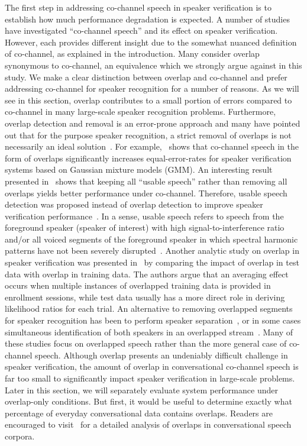 The first step in addressing co-channel speech in speaker verification is to establish how much performance degradation is expected. 
A number of studies have investigated ``co-channel speech'' and its effect on speaker verification. 
However, each provides different insight due to the somewhat nuanced definition of co-channel, as explained in the introduction. 
Many consider overlap synonymous to co-channel, an equivalence which we strongly argue against in this study. 
We make a clear distinction between overlap and co-channel and prefer addressing co-channel for speaker recognition for a number of reasons. 
As we will see in this section, overlap contributes to a small portion of errors compared to co-channel in many large-scale speaker recognition problems. 
Furthermore, overlap detection and removal is an error-prone approach and many have pointed out that for the purpose speaker recognition, a strict removal of overlaps is not necessarily an ideal solution~\cite{smolenski_tut}. 
For example,~\cite{yantorno_report} shows that co-channel speech in the form of overlaps significantly increases equal-error-rates for speaker verification systems based on Gaussian mixture models (GMM). 
An interesting result presented in~\cite{yantorno_report} shows that keeping all ``usable speech'' rather than removing all overlaps yields better performance under co-channel.  
Therefore, usable speech detection was proposed instead of overlap detection to improve speaker verification performance~\cite{Dwang_03, Dwang_03_trans}. 
In a sense, usable speech refers to speech from the foreground speaker (speaker of interest) with high signal-to-interference ratio and/or all voiced segments of the foreground speaker in which spectral harmonic patterns have not been severely disrupted~\cite{smolenski_tut}. Another analytic study on overlap in speaker verification was presented in~\cite{navid_pyknogram_jp} by comparing the impact of overlap in test data with overlap in training data. 
The authors argue that an averaging effect occurs when multiple instances of overlapped training data is provided in enrollment sessions, while test data usually has a more direct role in deriving likelihood ratios for each trial. 
An alternative to removing overlapped segments for speaker recognition has been to perform speaker separation~\cite{saeidi2010signal, mowlaee2010joint}, or in some cases simultaneous identification of both speakers in an overlapped stream~\cite{zhao2015cochannel, sadjadi_heck_icassp14}. 
Many of these studies focus on overlapped speech rather than the more general case of co-channel speech. 
Although overlap presents an undeniably difficult challenge in speaker verification, the amount of overlap in conversational co-channel speech is far too small to significantly impact speaker verification in large-scale problems. 
Later in this section, we will separately evaluate system performance under overlap-only conditions. 
But first, it would be useful to determine exactly what percentage of everyday conversational data contains overlaps. 
Readers are encouraged to visit~\cite{shriberg_01} for a detailed analysis of overlaps in conversational speech corpora. 

